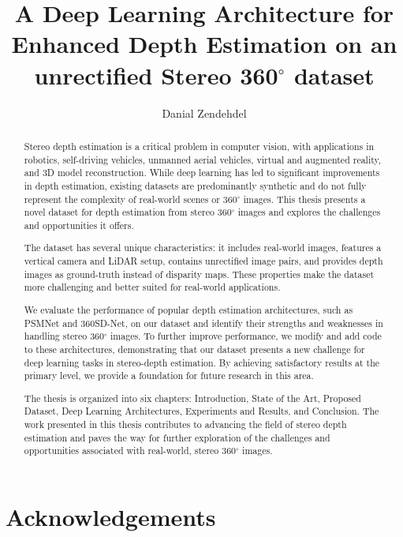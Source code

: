 \documentclass[english, LaM, oneside]{sapthesis}%
\title{A Deep Learning Architecture for Enhanced Depth Estimation on an unrectified Stereo 360$^{\circ}$ dataset}
\author{Danial Zendehdel}
\begin{document}
\frontmatter
\maketitle

\begin{abstract}

Stereo depth estimation is a critical problem in computer vision, with applications in robotics, self-driving vehicles, unmanned aerial vehicles, virtual and augmented reality, and 3D model reconstruction. While deep learning has led to significant improvements in depth estimation, existing datasets are predominantly synthetic and do not fully represent the complexity of real-world scenes or 360$^\circ$ images. This thesis presents a novel dataset for depth estimation from stereo 360$^\circ$ images and explores the challenges and opportunities it offers.

The dataset has several unique characteristics: it includes real-world images, features a vertical camera and LiDAR setup, contains unrectified image pairs, and provides depth images as ground-truth instead of disparity maps. These properties make the dataset more challenging and better suited for real-world applications.

We evaluate the performance of popular depth estimation architectures, such as PSMNet and 360SD-Net, on our dataset and identify their strengths and weaknesses in handling stereo 360$^\circ$ images. To further improve performance, we modify and add code to these architectures, demonstrating that our dataset presents a new challenge for deep learning tasks in stereo-depth estimation. By achieving satisfactory results at the primary level, we provide a foundation for future research in this area.

The thesis is organized into six chapters: Introduction, State of the Art, Proposed Dataset, Deep Learning Architectures, Experiments and Results, and Conclusion. The work presented in this thesis contributes to advancing the field of stereo depth estimation and paves the way for further exploration of the challenges and opportunities associated with real-world, stereo 360$^\circ$ images.


\end{abstract}

\newpage

\section*{Acknowledgements}
\end{document}
